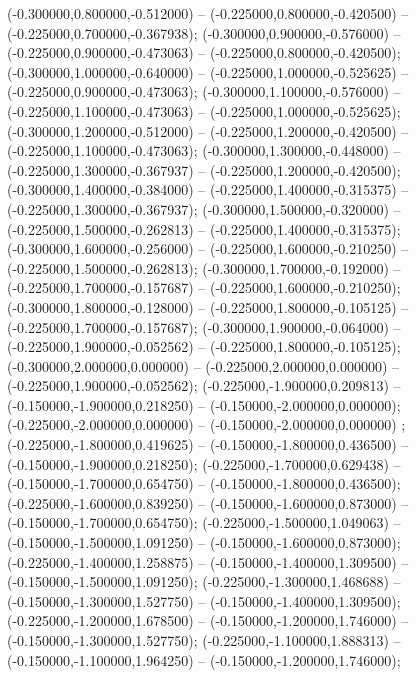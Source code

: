  (-0.300000,0.800000,-0.512000) -- (-0.225000,0.800000,-0.420500) -- (-0.225000,0.700000,-0.367938);
 (-0.300000,0.900000,-0.576000) -- (-0.225000,0.900000,-0.473063) -- (-0.225000,0.800000,-0.420500);
 (-0.300000,1.000000,-0.640000) -- (-0.225000,1.000000,-0.525625) -- (-0.225000,0.900000,-0.473063);
 (-0.300000,1.100000,-0.576000) -- (-0.225000,1.100000,-0.473063) -- (-0.225000,1.000000,-0.525625);
 (-0.300000,1.200000,-0.512000) -- (-0.225000,1.200000,-0.420500) -- (-0.225000,1.100000,-0.473063);
 (-0.300000,1.300000,-0.448000) -- (-0.225000,1.300000,-0.367937) -- (-0.225000,1.200000,-0.420500);
 (-0.300000,1.400000,-0.384000) -- (-0.225000,1.400000,-0.315375) -- (-0.225000,1.300000,-0.367937);
 (-0.300000,1.500000,-0.320000) -- (-0.225000,1.500000,-0.262813) -- (-0.225000,1.400000,-0.315375);
 (-0.300000,1.600000,-0.256000) -- (-0.225000,1.600000,-0.210250) -- (-0.225000,1.500000,-0.262813);
 (-0.300000,1.700000,-0.192000) -- (-0.225000,1.700000,-0.157687) -- (-0.225000,1.600000,-0.210250);
 (-0.300000,1.800000,-0.128000) -- (-0.225000,1.800000,-0.105125) -- (-0.225000,1.700000,-0.157687);
 (-0.300000,1.900000,-0.064000) -- (-0.225000,1.900000,-0.052562) -- (-0.225000,1.800000,-0.105125);
 (-0.300000,2.000000,0.000000) -- (-0.225000,2.000000,0.000000) -- (-0.225000,1.900000,-0.052562);
 (-0.225000,-1.900000,0.209813) -- (-0.150000,-1.900000,0.218250) -- (-0.150000,-2.000000,0.000000);
 (-0.225000,-2.000000,0.000000) -- (-0.150000,-2.000000,0.000000) ;
 (-0.225000,-1.800000,0.419625) -- (-0.150000,-1.800000,0.436500) -- (-0.150000,-1.900000,0.218250);
 (-0.225000,-1.700000,0.629438) -- (-0.150000,-1.700000,0.654750) -- (-0.150000,-1.800000,0.436500);
 (-0.225000,-1.600000,0.839250) -- (-0.150000,-1.600000,0.873000) -- (-0.150000,-1.700000,0.654750);
 (-0.225000,-1.500000,1.049063) -- (-0.150000,-1.500000,1.091250) -- (-0.150000,-1.600000,0.873000);
 (-0.225000,-1.400000,1.258875) -- (-0.150000,-1.400000,1.309500) -- (-0.150000,-1.500000,1.091250);
 (-0.225000,-1.300000,1.468688) -- (-0.150000,-1.300000,1.527750) -- (-0.150000,-1.400000,1.309500);
 (-0.225000,-1.200000,1.678500) -- (-0.150000,-1.200000,1.746000) -- (-0.150000,-1.300000,1.527750);
 (-0.225000,-1.100000,1.888313) -- (-0.150000,-1.100000,1.964250) -- (-0.150000,-1.200000,1.746000);
